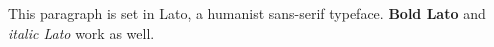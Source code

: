 \documentclass{article}
\begin{document}
This paragraph is set in Lato, a humanist sans-serif typeface.
\textbf{Bold Lato} and \textit{italic Lato} work as well.
\end{document}
